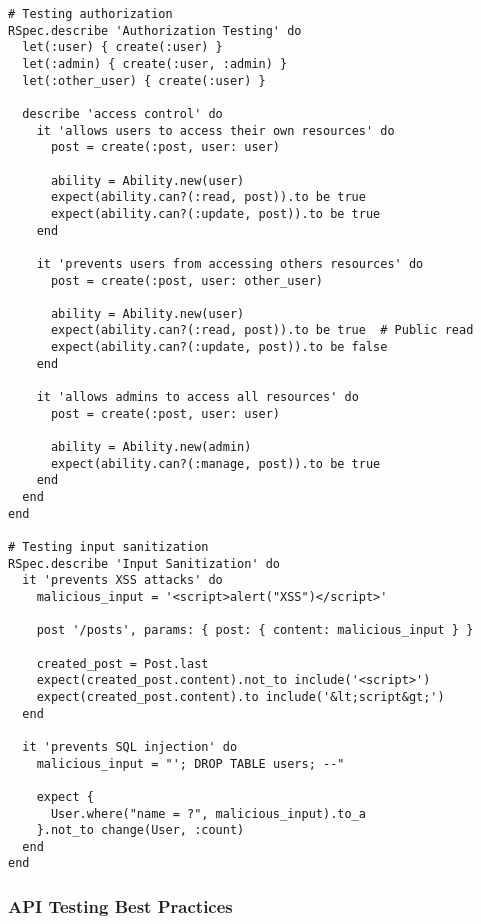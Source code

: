 \documentclass[12pt,a4paper]{article}
\begin{document}
\begin{lstlisting}
# Testing authorization
RSpec.describe 'Authorization Testing' do
  let(:user) { create(:user) }
  let(:admin) { create(:user, :admin) }
  let(:other_user) { create(:user) }

  describe 'access control' do
    it 'allows users to access their own resources' do
      post = create(:post, user: user)
      
      ability = Ability.new(user)
      expect(ability.can?(:read, post)).to be true
      expect(ability.can?(:update, post)).to be true
    end

    it 'prevents users from accessing others resources' do
      post = create(:post, user: other_user)
      
      ability = Ability.new(user)
      expect(ability.can?(:read, post)).to be true  # Public read
      expect(ability.can?(:update, post)).to be false
    end

    it 'allows admins to access all resources' do
      post = create(:post, user: user)
      
      ability = Ability.new(admin)
      expect(ability.can?(:manage, post)).to be true
    end
  end
end

# Testing input sanitization
RSpec.describe 'Input Sanitization' do
  it 'prevents XSS attacks' do
    malicious_input = '<script>alert("XSS")</script>'
    
    post '/posts', params: { post: { content: malicious_input } }
    
    created_post = Post.last
    expect(created_post.content).not_to include('<script>')
    expect(created_post.content).to include('&lt;script&gt;')
  end

  it 'prevents SQL injection' do
    malicious_input = "'; DROP TABLE users; --"
    
    expect {
      User.where("name = ?", malicious_input).to_a
    }.not_to change(User, :count)
  end
end
\end{lstlisting}

\subsubsection{API Testing Best Practices}
\end{document}
